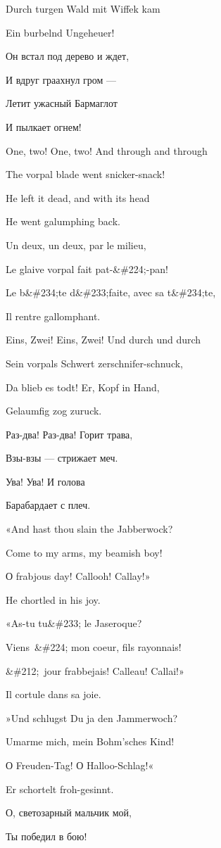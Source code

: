 \documentclass[../main.tex]{subfiles}
\begin{document}
Durch turgen Wald mit Wiffek kam

Ein burbelnd Ungeheuer!

Он встал под дерево и ждет,

И вдруг граахнул гром ---

Летит ужасный Бармаглот

И пылкает огнем!

One, two! One, two! And through and through

The vorpal blade went snicker-snack!

He left it dead, and with its head

He went galumphing back.

Un deux, un deux, par le milieu,

Le glaive vorpal fait pat-\&\#224;-pan!

Le b\&\#234;te d\&\#233;faite, avec sa t\&\#234;te,

Il rentre gallomphant.

Eins, Zwei! Eins, Zwei! Und durch und durch

Sein vorpals Schwert zerschnifer-schnuck,

Da blieb es todt! Er, Kopf in Hand,

Gelaumfig zog zuruck.

Раз-два! Раз-два! Горит трава,

Взы-взы --- стрижает меч.

Ува! Ува! И голова

Барабардает с плеч.

«And hast thou slain the Jabberwock?

Come to my arms, my beamish boy!

О frabjous day! Callooh! Callay!»

He chortled in his joy.

«As-tu tu\&\#233; le Jaseroque?

Viens~\&\#224; mon coeur, fils rayonnais!

\&\#212;~jour frabbejais! Calleau! Callai!»

Il cortule dans sa joie.

»Und schlugst Du ja den Jammerwoch?

Umarme mich, mein Bohm'sches Kind!

О Freuden-Tag! О Halloo-Schlag!«

Er schortelt froh-gesinnt.

О, светозарный мальчик мой,

Ты победил в бою!
\end{document}
